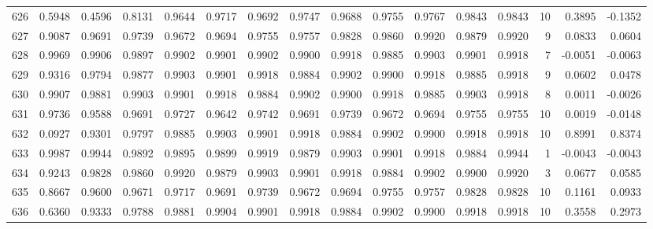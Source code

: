 \begin{tabular}{lrrrrrrrrrrrrrrr}
626 &      0.5948 &  0.4596 &  0.8131 &  0.9644 &  0.9717 &  0.9692 &  0.9747 &  0.9688 &  0.9755 &  0.9767 &   0.9843 &     0.9843 &     10 &                    0.3895 &                    -0.1352 \\
627 &      0.9087 &  0.9691 &  0.9739 &  0.9672 &  0.9694 &  0.9755 &  0.9757 &  0.9828 &  0.9860 &  0.9920 &   0.9879 &     0.9920 &      9 &                    0.0833 &                     0.0604 \\
628 &      0.9969 &  0.9906 &  0.9897 &  0.9902 &  0.9901 &  0.9902 &  0.9900 &  0.9918 &  0.9885 &  0.9903 &   0.9901 &     0.9918 &      7 &                   -0.0051 &                    -0.0063 \\
629 &      0.9316 &  0.9794 &  0.9877 &  0.9903 &  0.9901 &  0.9918 &  0.9884 &  0.9902 &  0.9900 &  0.9918 &   0.9885 &     0.9918 &      9 &                    0.0602 &                     0.0478 \\
630 &      0.9907 &  0.9881 &  0.9903 &  0.9901 &  0.9918 &  0.9884 &  0.9902 &  0.9900 &  0.9918 &  0.9885 &   0.9903 &     0.9918 &      8 &                    0.0011 &                    -0.0026 \\
631 &      0.9736 &  0.9588 &  0.9691 &  0.9727 &  0.9642 &  0.9742 &  0.9691 &  0.9739 &  0.9672 &  0.9694 &   0.9755 &     0.9755 &     10 &                    0.0019 &                    -0.0148 \\
632 &      0.0927 &  0.9301 &  0.9797 &  0.9885 &  0.9903 &  0.9901 &  0.9918 &  0.9884 &  0.9902 &  0.9900 &   0.9918 &     0.9918 &     10 &                    0.8991 &                     0.8374 \\
633 &      0.9987 &  0.9944 &  0.9892 &  0.9895 &  0.9899 &  0.9919 &  0.9879 &  0.9903 &  0.9901 &  0.9918 &   0.9884 &     0.9944 &      1 &                   -0.0043 &                    -0.0043 \\
634 &      0.9243 &  0.9828 &  0.9860 &  0.9920 &  0.9879 &  0.9903 &  0.9901 &  0.9918 &  0.9884 &  0.9902 &   0.9900 &     0.9920 &      3 &                    0.0677 &                     0.0585 \\
635 &      0.8667 &  0.9600 &  0.9671 &  0.9717 &  0.9691 &  0.9739 &  0.9672 &  0.9694 &  0.9755 &  0.9757 &   0.9828 &     0.9828 &     10 &                    0.1161 &                     0.0933 \\
636 &      0.6360 &  0.9333 &  0.9788 &  0.9881 &  0.9904 &  0.9901 &  0.9918 &  0.9884 &  0.9902 &  0.9900 &   0.9918 &     0.9918 &     10 &                    0.3558 &                     0.2973 \\

\end{tabular}
